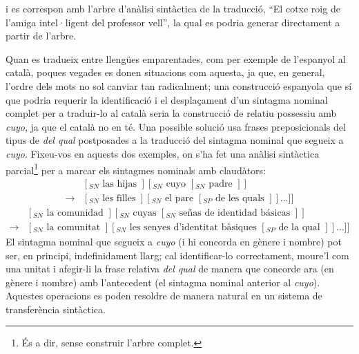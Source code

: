 i es correspon amb l'arbre d'anàlisi sintàctica de la
traducció, ``El cotxe roig de l'amiga intel·ligent del professor
vell'', la qual es podria generar directament a partir de l'arbre.

Quan es tradueix entre llengües emparentades, com per exemple de
l'espanyol al català, poques vegades es donen situacions com aquesta,
ja que, en general, l'ordre dels mots no sol canviar tan radicalment;
una construcció espanyola que sí que podria requerir la identificació
i el desplaçament d'un sintagma nominal complet per a traduir-lo al
català seria la construcció de relatiu possessiu amb \emph{cuyo}, ja
que el català no en té. Una possible solució usa frases preposicionals
del tipus de \emph{del qual} postposades a la traducció del sintagma
nominal que segueix a \emph{cuyo}. Fixeu-vos en aquests dos exemples,
on s'ha fet una anàlisi sintàctica parcial\footnote{És a dir, sense
  construir l'arbre complet.}  per a marcar els sintagmes nominals amb
claudàtors:
$$\begin{array}{ll}
& [_{SN} \mbox{ las hijas }] [_{SN} \mbox{ cuyo } [_{SN} \mbox{ padre } ] ] 
\\ \rightarrow  &
[_{SN} \mbox{ les filles } ] [_{SN}
\mbox{ el pare } [_{SP} \mbox{ de les quals } ] ] \ldots ] ] 
\end{array}
$$
$$
\begin{array}{ll}
& [_{SN} \mbox{ la comunidad }] [_{SN} \mbox{ cuyas } [_{SN} \mbox{ se\~{n}as de
identidad básicas } ] ]
\\ \rightarrow &
[_{SN} \mbox{ la comunitat }] [_{SN}
\mbox{ les senyes d'identitat bàsiques } [_{SP} \mbox{ de la qual } ] ] \ldots ] ] 
\end{array}
$$
El sintagma nominal que segueix a \emph{cuyo} (i hi concorda en gènere
i nombre) 
pot ser, en principi, indefinidament llarg;
cal identificar-lo correctament, moure'l com una unitat i afegir-li la frase 
relativa {\em
del qual} de manera que 
concorde ara (en gènere i nombre) amb l'antecedent (el sintagma nominal
anterior al \emph{cuyo}). Aquestes operacions es poden resoldre de
manera natural en un sistema de transferència sintàctica.

